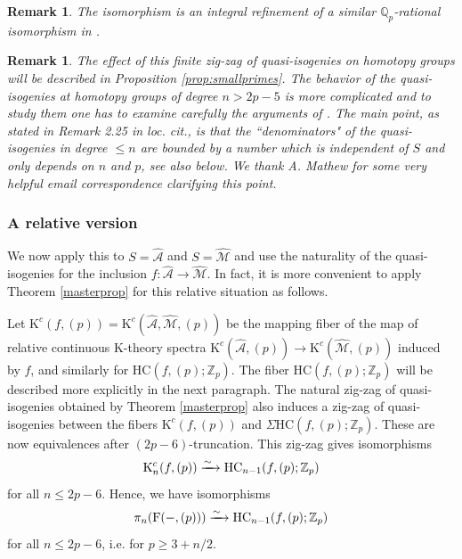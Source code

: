 \documentclass[reqno,11pt,letterpaper]{amsart}
\theoremstyle{plain}
\numberwithin{equation}{subsection}
\newtheorem{Remark}[equation]{Remark}
\theoremstyle{remark}
\theoremstyle{plain}
\theoremstyle{definition}\newtheorem*{notation}{Notation}
\newcommand{\A}{{\mathcal A}}
\newcommand{\Q}{{\mathbb Q}}
\newcommand{\M}{{\mathcal M}}
\newcommand{\RK}{\mathrm{K}}
\newcommand{\RF}{\mathrm{F}}
\newcommand{\BZ}{\mathbb{Z}}
\newcommand{\HC}{\mathrm{HC}}
\newcommand{\wh}{\widehat}
\begin{document}
\begin{Remark}
{\rm The isomorphism is an integral refinement of a similar $\Q_p$-rational isomorphism in \cite{Be14}.}
\end{Remark}

\begin{Remark}\label{rem:smallprimes}
{\rm The effect of this finite zig-zag of quasi-isogenies on homotopy groups will be described in Proposition \ref{prop:smallprimes}. The behavior of the quasi-isogenies at homotopy groups of degree $n>2p-5$  is more complicated and to study them one has to examine carefully the arguments of
\cite{NikolausBFSq}. The main point, as stated in Remark 2.25 in \emph{loc. cit.}, is that the ``denominators" of the quasi-isogenies in degree $\leq n$ are bounded by a number which is independent of $S$ and only depends on $n$ and $p$, see also below. We thank A. Mathew for some very helpful email correspondence clarifying this point.  }
\end{Remark}

\subsubsection{A relative version}
We now apply this to $S=\wh \A$ and $S=\wh \M $ and use the naturality of the quasi-isogenies for the inclusion $f: \wh \A\to \wh \M $. In fact, it is more convenient to apply Theorem \ref{masterprop}  for this relative situation as follows.

Let $\RK^c(f, (p))=\RK^c(\wh \A, \wh \M, (p))$ be  the mapping fiber of the map of relative continuous $\RK$-theory spectra $\RK^c(\wh \A, (p))\to \RK^c(\wh \M, (p))$ induced by $f$, and similarly for 
 $ \HC(f, (p);\BZ_p)$. The fiber $\HC(f, (p);\BZ_p)$ will be described more explicitly in the next paragraph. The natural zig-zag of quasi-isogenies obtained by Theorem \ref{masterprop} also induces a  zig-zag of quasi-isogenies 
between the fibers $\RK^c(f, (p))$ and $\Sigma\HC(f, (p);\BZ_p)$. These are now 
equivalences after $(2p-6)$-truncation. 
This zig-zag gives   isomorphisms
\begin{equation}\label{relativeBeil}
 \RK^c_n(f, (p))\xrightarrow{ \sim\ }{\rm HC}_{n-1}(f, (p);\BZ_p)
\end{equation}
for all $n\leq 2p-6$. 
Hence, we have isomorphisms
\begin{equation}\label{isopinHC}
  \pi_n(\RF(-, (p)))\xrightarrow{ \sim\ } {\rm HC}_{n-1}(f, (p);\BZ_p)
\end{equation}
for all $n\leq 2p-6$, i.e. for $p\geq 3+n/2$.
\end{document}
